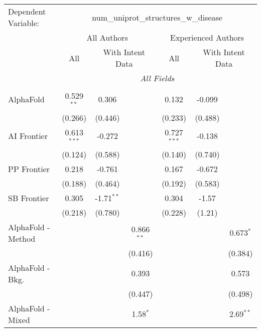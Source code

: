 \begingroup
\centering
\begin{tabular}{lcccccc}
   \tabularnewline \midrule \midrule
   Dependent Variable: & \multicolumn{6}{c}{num\_uniprot\_structures\_w\_disease}\\
 & \multicolumn{3}{c}{All Authors} & \multicolumn{3}{c}{Experienced Authors} \\
\cmidrule(lr){2-4} \cmidrule(lr){5-7}
 & \multicolumn{1}{c}{All} & \multicolumn{2}{c}{With Intent Data} & \multicolumn{1}{c}{All} & \multicolumn{2}{c}{With Intent Data} \\
\cmidrule(lr){2-2} \cmidrule(lr){3-4} \cmidrule(lr){5-5} \cmidrule(lr){6-7}
 & \multicolumn{6}{c}{\textit{All Fields}} \\ \\
   AlphaFold            & 0.529$^{**}$  & 0.306        &              & 0.132         & -0.099  &   \\   
                        & (0.266)       & (0.446)      &              & (0.233)       & (0.488) &   \\   
   AI Frontier          & 0.613$^{***}$ & -0.272       &              & 0.727$^{***}$ & -0.138  &   \\   
                        & (0.124)       & (0.588)      &              & (0.140)       & (0.740) &   \\   
   PP Frontier          & 0.218         & -0.761       &              & 0.167         & -0.672  &   \\   
                        & (0.188)       & (0.464)      &              & (0.192)       & (0.583) &   \\   
   SB Frontier          & 0.305         & -1.71$^{**}$ &              & 0.304         & -1.57   &   \\   
                        & (0.218)       & (0.780)      &              & (0.228)       & (1.21)  &   \\   
   AlphaFold - Method   &               &              & 0.866$^{**}$ &               &         & 0.673$^{*}$\\   
                        &               &              & (0.416)      &               &         & (0.384)\\   
   AlphaFold - Bkg.     &               &              & 0.393        &               &         & 0.573\\   
                        &               &              & (0.447)      &               &         & (0.498)\\   
   AlphaFold - Mixed    &               &              & 1.58$^{*}$   &               &         & 2.69$^{**}$\\   

\end{tabular}
